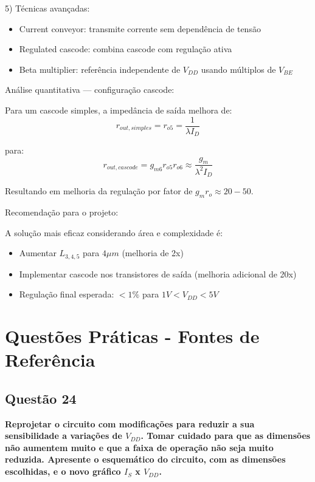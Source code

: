 ﻿\documentclass[12pt,a4paper]{article}
\begin{document}
5) Técnicas avançadas:
\begin{itemize}
    \item Current conveyor: transmite corrente sem dependência de tensão
    \item Regulated cascode: combina cascode com regulação ativa
    \item Beta multiplier: referência independente de $V_{DD}$ usando múltiplos de $V_{BE}$
\end{itemize}

Análise quantitativa — configuração cascode:

Para um cascode simples, a impedância de saída melhora de:
$$r_{out,simples} = r_{o5} = \frac{1}{\lambda I_D} $$

para:
$$r_{out,cascode} = g_{m6} r_{o5} r_{o6} \approx \frac{g_m}{\lambda^2 I_D} $$

Resultando em melhoria da regulação por fator de $g_m r_o \approx 20-50$.

Recomendação para o projeto:

A solução mais eficaz considerando área e complexidade é:
\begin{itemize}
    \item Aumentar $L_{3,4,5}$ para $4\mu m$ (melhoria de 2x)
    \item Implementar cascode nos transistores de saída (melhoria adicional de 20x)
    \item Regulação final esperada: $< 1\%$ para $1V < V_{DD} < 5V$
\end{itemize}

\newpage

\section*{Questões Práticas - Fontes de Referência}

\subsection*{Questão 24}

\textbf{Reprojetar o circuito com modificações para reduzir a sua sensibilidade a variações de $V_{DD}$. Tomar cuidado para que as dimensões não aumentem muito e que a faixa de operação não seja muito reduzida. Apresente o esquemático do circuito, com as dimensões escolhidas, e o novo gráfico $I_S$ x $V_{DD}$.}
\end{document}
